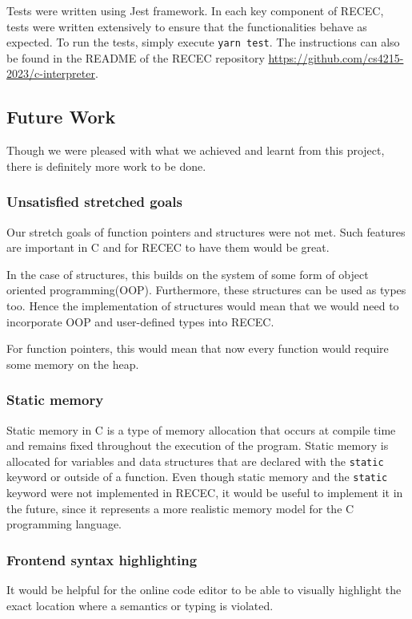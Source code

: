 \documentclass[a4paper]{article}
\begin{document}
Tests were written using Jest framework. In each key component of RECEC, tests were written extensively to ensure that the functionalities behave as expected. To run the tests, simply execute \texttt{yarn  test}. The instructions can also be found in the README of the RECEC repository \url{https://github.com/cs4215-2023/c-interpreter}.

\subsection{Future Work}

Though we were pleased with what we achieved and learnt from this project, there is definitely more work to be done. 

\subsubsection{Unsatisfied stretched goals}

Our stretch goals of function pointers and structures were not met. Such features are important in C and for RECEC to have them would be great. 

In the case of structures, this builds on the system of some form of object oriented programming(OOP). Furthermore, these structures can be used as types too. Hence the implementation of structures would mean that we would need to incorporate OOP and user-defined types into RECEC.

For function pointers, this would mean that now every function would require some memory on the heap.

\subsubsection{Static memory}

Static memory in C is a type of memory allocation that occurs at compile time and remains fixed throughout the execution of the program. Static memory is allocated for variables and data structures that are declared with the \texttt{static} keyword or outside of a function. Even though static memory and the \texttt{static} keyword were not implemented in RECEC, it would be useful to implement it in the future, since it represents a more realistic memory model for the C programming language.

\subsubsection{Frontend syntax highlighting}

It would be helpful for the online code editor to be able to visually highlight the exact location where a semantics or typing is violated.
\end{document}

